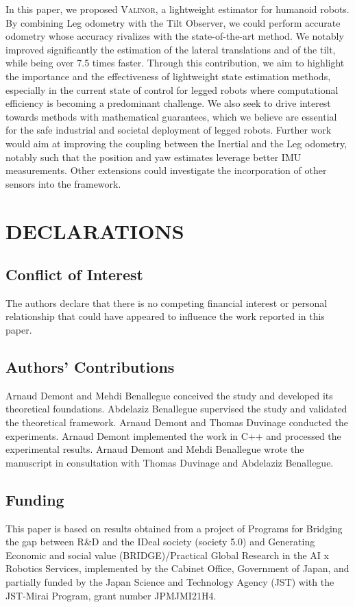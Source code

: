 \documentclass{IJCAS}
\begin{document}
In this paper, we proposed {\scshape Valinor}, a lightweight estimator for humanoid robots. By combining Leg odometry with the Tilt Observer, we could perform accurate odometry whose accuracy rivalizes with the state-of-the-art method. We notably improved significantly the estimation of the lateral translations and of the tilt, while being over 7.5 times faster. Through this contribution, we aim to highlight the importance and the effectiveness of lightweight state estimation methods, especially in the current state of control for legged robots where computational efficiency is becoming a predominant challenge. We also seek to drive interest towards methods with mathematical guarantees, which we believe are essential for the safe industrial and societal deployment of legged robots. 
Further work would aim at improving the coupling between the Inertial and the Leg odometry, notably such that the position and yaw estimates leverage better IMU measurements. Other extensions could investigate the incorporation of other sensors into the framework.



\section*{DECLARATIONS}

\subsection*{Conflict of Interest }
The authors declare that there is no competing financial interest or personal relationship that could have appeared to influence the work reported in this paper.

\subsection*{Authors' Contributions}
Arnaud Demont and Mehdi Benallegue conceived the study and developed its theoretical foundations. Abdelaziz Benallegue supervised the study and validated the theoretical framework. Arnaud Demont and Thomas Duvinage conducted the experiments. Arnaud Demont implemented the work in C++ and processed the experimental results. Arnaud Demont and Mehdi Benallegue wrote the manuscript in consultation with Thomas Duvinage and Abdelaziz Benallegue.

\subsection*{Funding }
This paper is based on results obtained from a project of Programs for Bridging the gap between R\&D and the IDeal society (society 5.0) and Generating Economic and social value (BRIDGE)/Practical Global Research in the AI x Robotics Services, implemented by the Cabinet Office, Government of Japan, and partially funded by the Japan Science and Technology Agency (JST) with the JST-Mirai Program, grant number JPMJMI21H4.
\end{document}
